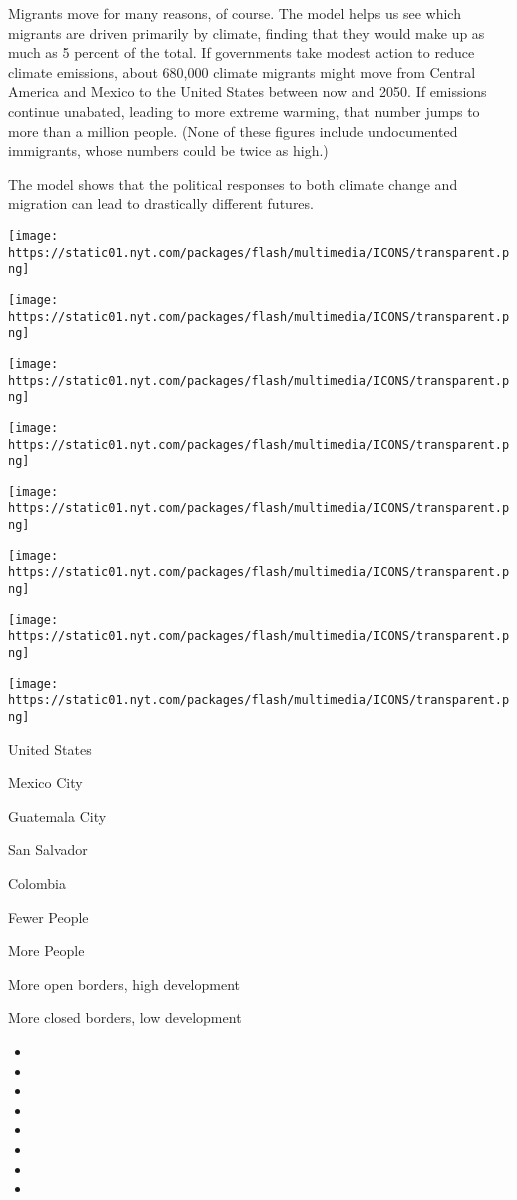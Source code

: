 Migrants move for many reasons, of course. The model helps us see which
migrants are driven primarily by climate, finding that they would make
up as much as 5 percent of the total. If governments take modest action
to reduce climate emissions, about 680,000 climate migrants might move
from Central America and Mexico to the United States between now and
2050. If emissions continue unabated, leading to more extreme warming,
that number jumps to more than a million people. (None of these figures
include undocumented immigrants, whose numbers could be twice as high.)

The model shows that the political responses to both climate change and
migration can lead to drastically different futures.

\texttt{[image: https://static01.nyt.com/packages/flash/multimedia/ICONS/transparent.png]}

\texttt{[image: https://static01.nyt.com/packages/flash/multimedia/ICONS/transparent.png]}

\texttt{[image: https://static01.nyt.com/packages/flash/multimedia/ICONS/transparent.png]}

\texttt{[image: https://static01.nyt.com/packages/flash/multimedia/ICONS/transparent.png]}

\texttt{[image: https://static01.nyt.com/packages/flash/multimedia/ICONS/transparent.png]}

\texttt{[image: https://static01.nyt.com/packages/flash/multimedia/ICONS/transparent.png]}

\texttt{[image: https://static01.nyt.com/packages/flash/multimedia/ICONS/transparent.png]}

\texttt{[image: https://static01.nyt.com/packages/flash/multimedia/ICONS/transparent.png]}

United States

Mexico City

Guatemala City

San Salvador

Colombia

Fewer People

More People

More open borders, high development

More closed borders, low development

\begin{itemize}
\item
\item
\item
\item
\item
\item
\item
\item
\end{itemize}

